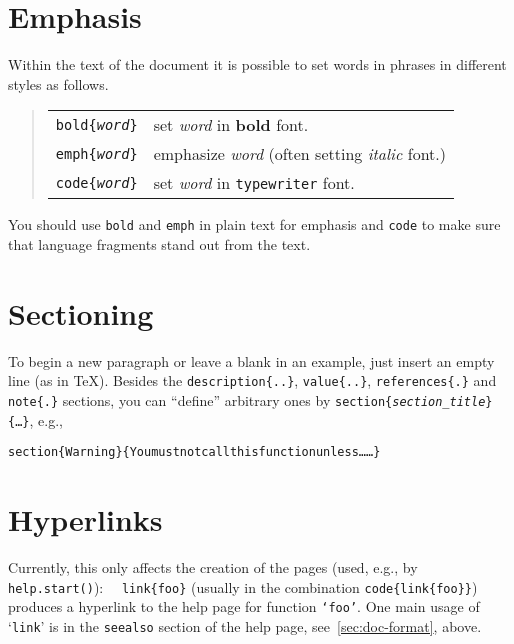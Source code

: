 \bigskip
\pagebreak[3]

\section{Emphasis}
Within the text of the document it is possible to set words in phrases
in different styles as follows.
\begin{quote}
  \begin{tabular}{ll}
    \texttt{\BS{}bold\{\textit{word}\}}
    & set \emph{word} in \textbf{bold} font. \\
    \texttt{\BS{}emph\{\textit{word}\}}
    & emphasize \emph{word} (often setting \textit{italic} font.)  \\
    \texttt{\BS{}code\{\textit{word}\}}
    & set \emph{word} in \texttt{typewriter} font. \\
  \end{tabular}
\end{quote}
You should use \texttt{\BS{}bold} and \texttt{\BS{}emph} in plain text
for emphasis and \texttt{\BS{}code} to make sure that language fragments
stand out from the text.

\section{Sectioning}
To begin a new paragraph or leave a blank in an example, just insert an
empty line (as in \TeX).
Besides the \texttt{\BS{}description\{..\}}, \texttt{\BS{}value\{..\}},
\texttt{\BS{}references\{.\}} and \texttt{\BS{}note\{.\}} sections, you can
``define'' arbitrary ones by
\texttt{\BS{}section\{\emph{section\_title}\}\{\ldots\}}, e.g., 
\begin{display}
\begin{alltt}
\BS{}section\{Warning\}\{ You must not call this function unless \ldots\ldots\}
\end{alltt}
\end{display}

\section{Hyperlinks}
Currently, this only affects the creation of the \HTML{} pages (used, e.g.,
by \texttt{help.start()}): \ \
\texttt{\BS{}link\{foo\}} (usually in the combination
\texttt{\BS{}code\{\BS{}link\{foo\}\}}) 
produces a hyperlink to the help page for function \texttt{`foo'}.
One main usage of  `\texttt{\BS{}link}' is in the \texttt{\BS{}seealso}
section of the help page, see~\ref{sec:doc-format}, above.


